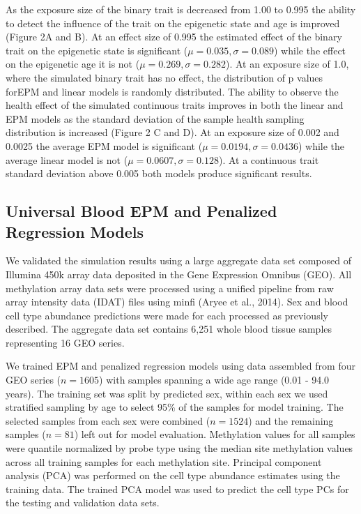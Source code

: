 \documentclass{article}
\begin{document}
{{\begin{linenumbers}
As the exposure size of the binary trait is decreased from 1.00 to 0.995 the ability to detect the influence of the 
trait on the epigenetic state and age is improved (Figure 2A and B). At an effect size of 0.995 the estimated effect 
of the binary trait on the epigenetic state is significant ($\mu =0.035, \sigma=0.089$) while the effect on the 
epigenetic age it is not ($\mu=0.269, \sigma=0.282$). At an exposure size of 1.0, where the simulated binary trait 
has no effect, the distribution of p values forEPM and linear models is randomly distributed. The ability to observe 
the health effect of the simulated continuous traits improves in both the linear and EPM models as the standard 
deviation of the sample health sampling distribution is increased (Figure 2 C and D). At an exposure size of 0.002 
and 0.0025 the average EPM model is significant ($\mu=0.0194, \sigma=0.0436$) while the average linear model is not 
($\mu=0.0607, \sigma=0.128$). At a continuous trait standard deviation above 0.005 both models produce significant 
results. 

\subsection{Universal Blood EPM and Penalized Regression Models}

We validated the simulation results using a  large aggregate data set composed of Illumina 450k array 
data\cite{Marabita2018-yi,Ventham2016-qj,Tan2014-ns,Johnson2020-vb,Voisin2015-ch,Soriano-Tarraga2016-tf,
Dabin_undated-pr,Horvath2015-af,Kurushima2019-gc,Zannas2019-bc,Braun2019-gp,Demetriou2013-jx,Tserel2015-qr} 
deposited in the Gene Expression Omnibus\cite{Barrett2012-gu} (GEO). All methylation array data sets were processed 
using a unified pipeline from raw array intensity data (IDAT) files using minfi (Aryee et al., 2014). Sex and blood 
cell type abundance predictions were made for each processed as previously described\cite{Houseman2012-rr,Aryee2014-ky}. 
The aggregate data set contains 6,251 whole blood tissue samples representing 16 GEO series. 

We trained EPM and penalized regression models using data assembled from four GEO 
series\cite{Johansson2013-of,Liu2013-qo,Butcher2017-nr,Damaso2020-gd}  ($n=1605$) with samples spanning a wide age 
range (0.01 - 94.0 years). The training set was split by predicted sex, within each sex we used stratified sampling by 
age to select 95\% of the samples for model training. The selected samples from each sex were combined 
($n=1524$) and the remaining samples ($n=81$) left out for  model evaluation. Methylation values for all samples were 
quantile normalized by probe type\cite{Horvath2013-sk} using the median site methylation values across all training 
samples for each methylation site.  Principal component analysis (PCA) was performed on the cell type abundance 
estimates using the training data. The trained PCA model was used to predict the cell type PCs for the testing 
and validation data sets. 


\end{linenumbers}}}
\end{document}
